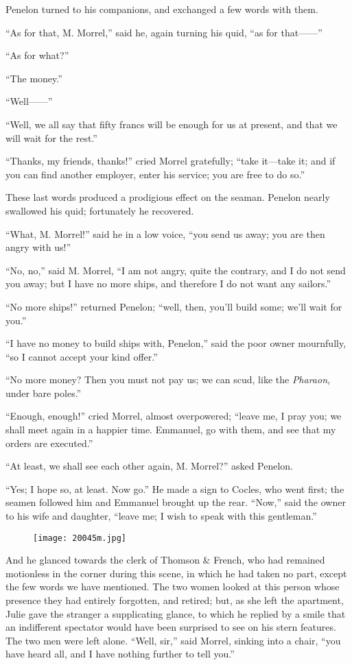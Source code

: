 Penelon turned to his companions, and exchanged a few words with them.

“As for that, M. Morrel,” said he, again turning his quid, “as for
that——”

“As for what?”

“The money.”

“Well——”

“Well, we all say that fifty francs will be enough for us at present,
and that we will wait for the rest.”

“Thanks, my friends, thanks!” cried Morrel gratefully; “take it—take
it; and if you can find another employer, enter his service; you are
free to do so.”

These last words produced a prodigious effect on the seaman. Penelon
nearly swallowed his quid; fortunately he recovered.

“What, M. Morrel!” said he in a low voice, “you send us away; you are
then angry with us!”

“No, no,” said M. Morrel, “I am not angry, quite the contrary, and I do
not send you away; but I have no more ships, and therefore I do not
want any sailors.”

“No more ships!” returned Penelon; “well, then, you’ll build some;
we’ll wait for you.”

“I have no money to build ships with, Penelon,” said the poor owner
mournfully, “so I cannot accept your kind offer.”

“No more money? Then you must not pay us; we can scud, like the
\textit{Pharaon}, under bare poles.”

“Enough, enough!” cried Morrel, almost overpowered; “leave me, I pray
you; we shall meet again in a happier time. Emmanuel, go with them, and
see that my orders are executed.”

“At least, we shall see each other again, M. Morrel?” asked Penelon.

“Yes; I hope so, at least. Now go.” He made a sign to Cocles, who went
first; the seamen followed him and Emmanuel brought up the rear. “Now,”
said the owner to his wife and daughter, “leave me; I wish to speak
with this gentleman.”

\begin{figure}[ht]
\texttt{[image: 20045m.jpg]}
\end{figure}

And he glanced towards the clerk of Thomson \& French, who had remained
motionless in the corner during this scene, in which he had taken no
part, except the few words we have mentioned. The two women looked at
this person whose presence they had entirely forgotten, and retired;
but, as she left the apartment, Julie gave the stranger a supplicating
glance, to which he replied by a smile that an indifferent spectator
would have been surprised to see on his stern features. The two men
were left alone. “Well, sir,” said Morrel, sinking into a chair, “you
have heard all, and I have nothing further to tell you.”

